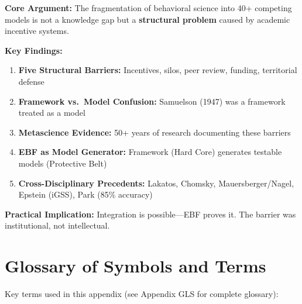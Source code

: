\begin{tcolorbox}[colback=blue!5!white, colframe=blue!75!black,
    title=\textbf{Chapter Summary}]

\textbf{Core Argument:}
The fragmentation of behavioral science into 40+ competing models is not a knowledge gap
but a \textbf{structural problem} caused by academic incentive systems.

\textbf{Key Findings:}
\begin{enumerate}[nosep]
    \item \textbf{Five Structural Barriers:} Incentives, silos, peer review, funding, territorial defense
    \item \textbf{Framework vs.\ Model Confusion:} Samuelson (1947) was a framework treated as a model
    \item \textbf{Metascience Evidence:} 50+ years of research documenting these barriers
    \item \textbf{EBF as Model Generator:} Framework (Hard Core) generates testable models (Protective Belt)
    \item \textbf{Cross-Disciplinary Precedents:} Lakatos, Chomsky, Mauersberger/Nagel, Epstein (iGSS), Park (85\% accuracy)
\end{enumerate}

\textbf{Practical Implication:}
Integration is possible—EBF proves it. The barrier was institutional, not intellectual.

\end{tcolorbox}


\section{Glossary of Symbols and Terms}
\label{sec:meta-glossary}

Key terms used in this appendix (see Appendix GLS for complete glossary):

